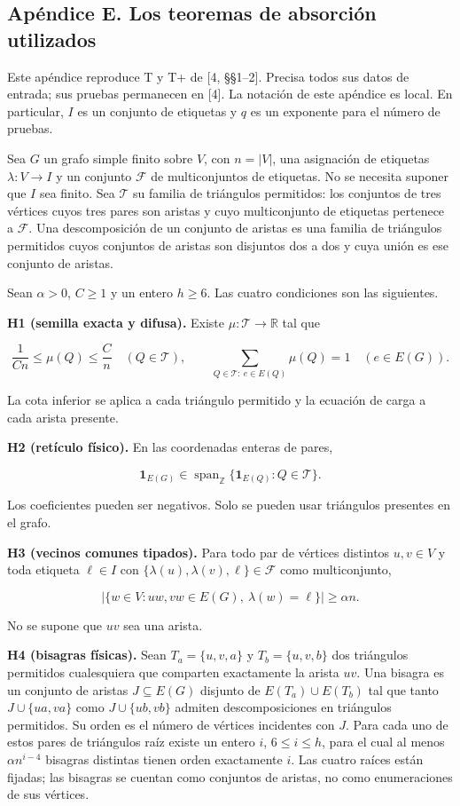 \documentclass[spanish,11pt,a4paper]{article}
\begin{document}
\subsection{Apéndice E. Los teoremas de absorción utilizados}\label{apuxe9ndice-e.-los-teoremas-de-absorciuxf3n-utilizados}

Este apéndice reproduce T y T+ de {[}4, §§1--2{]}. Precisa todos sus datos de entrada; sus pruebas permanecen en {[}4{]}. La notación de este apéndice es local. En particular, \(I\) es un conjunto de etiquetas y \(q\) es un exponente para el número de pruebas.

Sea \(G\) un grafo simple finito sobre \(V\), con \(n=|V|\), una asignación de etiquetas \(\lambda:V\to I\) y un conjunto \(\mathcal F\) de multiconjuntos de etiquetas. No se necesita suponer que \(I\) sea finito. Sea \(\mathcal T\) su familia de triángulos permitidos: los conjuntos de tres vértices cuyos tres pares son aristas y cuyo multiconjunto de etiquetas pertenece a \(\mathcal F\). Una descomposición de un conjunto de aristas es una familia de triángulos permitidos cuyos conjuntos de aristas son disjuntos dos a dos y cuya unión es ese conjunto de aristas.

Sean \(\alpha>0\), \(C\ge1\) y un entero \(h\ge6\). Las cuatro condiciones son las siguientes.

\textbf{H1 (semilla exacta y difusa).} Existe \(\mu:\mathcal T\to\mathbb R\) tal que

\[\frac1{Cn}\le\mu(Q)\le\frac Cn\quad(Q\in\mathcal T),\qquad
\sum_{Q\in\mathcal T:\ e\in E(Q)}\mu(Q)=1\quad(e\in E(G)).\]

La cota inferior se aplica a cada triángulo permitido y la ecuación de carga a cada arista presente.

\textbf{H2 (retículo físico).} En las coordenadas enteras de pares,

\[\mathbf1_{E(G)}\in\operatorname{span}_{\mathbb Z}
\{\mathbf1_{E(Q)}:Q\in\mathcal T\}.\]

Los coeficientes pueden ser negativos. Solo se pueden usar triángulos presentes en el grafo.

\textbf{H3 (vecinos comunes tipados).} Para todo par de vértices distintos \(u,v\in V\) y toda etiqueta \(\ell\in I\) con \(\{\lambda(u),\lambda(v),\ell\}\in\mathcal F\) como multiconjunto,

\[|\{w\in V:uw,vw\in E(G),\ \lambda(w)=\ell\}|\ge\alpha n.\]

No se supone que \(uv\) sea una arista.

\textbf{H4 (bisagras físicas).} Sean \(T_a=\{u,v,a\}\) y \(T_b=\{u,v,b\}\) dos triángulos permitidos cualesquiera que comparten exactamente la arista \(uv\). Una bisagra es un conjunto de aristas \(J\subseteq E(G)\) disjunto de \(E(T_a)\cup E(T_b)\) tal que tanto \(J\cup\{ua,va\}\) como \(J\cup\{ub,vb\}\) admiten descomposiciones en triángulos permitidos. Su orden es el número de vértices incidentes con \(J\). Para cada uno de estos pares de triángulos raíz existe un entero \(i\), \(6\le i\le h\), para el cual al menos \(\alpha n^{i-4}\) bisagras distintas tienen orden exactamente \(i\). Las cuatro raíces están fijadas; las bisagras se cuentan como conjuntos de aristas, no como enumeraciones de sus vértices.
\end{document}

